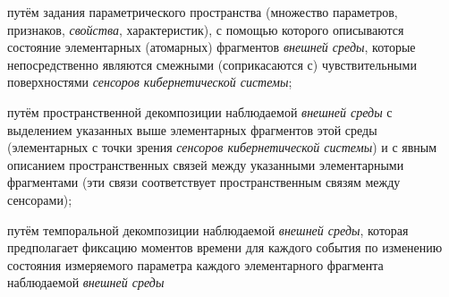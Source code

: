 \begin{scnsubstruct}
{\begin{scnitemize}
            \item путём задания параметрического пространства (множество параметров,
            признаков, \textit{свойства}, характеристик), с помощью которого описываются
            состояние элементарных (атомарных) фрагментов \textit{внешней среды}, которые
            непосредственно являются смежными (соприкасаются с) чувствительными
            поверхностями \textit{сенсоров кибернетической системы};
            \item путём пространственной декомпозиции наблюдаемой \textit{внешней среды} с
            выделением указанных выше элементарных фрагментов этой среды (элементарных с
            точки зрения  \textit{сенсоров кибернетической системы}) и с явным описанием
            пространственных связей между указанными элементарными фрагментами (эти связи
            соответствует пространственным связям между сенсорами);
            \item путём темпоральной декомпозиции наблюдаемой \textit{внешней среды},
            которая предполагает фиксацию моментов времени для каждого события по изменению
            состояния измеряемого параметра каждого элементарного фрагмента наблюдаемой
            \textit{внешней среды}
        \end{scnitemize}
    }
\end{scnsubstruct}
